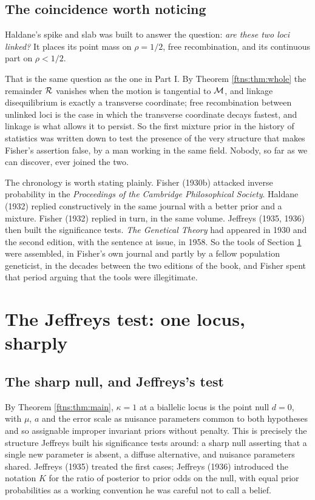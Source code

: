 \subsection{The coincidence worth noticing}

Haldane's spike and slab was built to answer the question: \emph{are these two loci linked?} It
places its point mass on $\rho=1/2$, free recombination, and its continuous part on $\rho<1/2$.

That is the same question as the one in Part I. By Theorem \ref{ftns:thm:whole} the remainder $\mathcal{R}$
vanishes when the motion is tangential to $\mathcal{M}$, and linkage disequilibrium is exactly a transverse
coordinate; free recombination between unlinked loci is the case in which the transverse coordinate
decays fastest, and linkage is what allows it to persist. So the first mixture prior in the history
of statistics was written down to test the presence of the very structure that makes Fisher's
assertion false, by a man working in the same field. Nobody, so far as we can discover, ever joined
the two.

The chronology is worth stating plainly. Fisher (1930b) attacked inverse probability in the
\emph{Proceedings of the Cambridge Philosophical Society}. Haldane (1932) replied constructively in
the same journal with a better prior and a mixture. Fisher (1932) replied in turn, in the same
volume. Jeffreys (1935, 1936) then built the significance tests. \emph{The Genetical Theory} had
appeared in 1930 and the second edition, with the sentence at issue, in 1958. So the tools of
Section \ref{ftns:sec:jeffreys} were assembled, in Fisher's own journal and partly by a fellow
population geneticist, in the decades between the two editions of the book, and Fisher spent that
period arguing that the tools were illegitimate.

\section{The Jeffreys test: one locus, sharply}
\label{ftns:sec:jeffreys}

\subsection{The sharp null, and Jeffreys's test}

By Theorem \ref{ftns:thm:main}, $\kappa=1$ at a biallelic locus is the point null $d=0$, with $\mu$, $a$
and the error scale as nuisance parameters common to both hypotheses and so assignable improper
invariant priors without penalty. This is precisely the structure Jeffreys built his significance
tests around: a sharp null asserting that a single new parameter is absent, a diffuse alternative,
and nuisance parameters shared. Jeffreys (1935) treated the first cases; Jeffreys (1936) introduced
the notation $K$ for the ratio of posterior to prior odds on the null, with equal prior
probabilities as a working convention he was careful not to call a belief.

